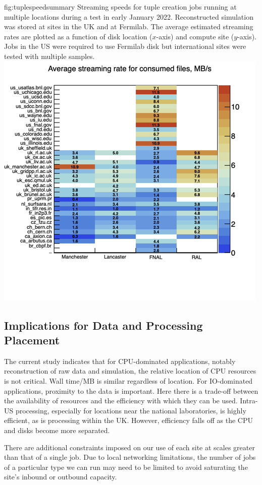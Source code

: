\documentclass[../main-v1.tex]{subfiles}
\begin{document}
\begin{dunefigure}
{fig:tuplespeedsummary} 
{Streaming speeds for tuple creation jobs running at multiple locations during a test in early January 2022. Reconstructed simulation was stored at sites in the UK and at Fermilab.  The average estimated streaming rates are plotted as a function of disk location ($x$-axis) and compute site ($y$-axis). Jobs in the US were required to use Fermilab disk but international sites were tested with multiple samples.}
\includegraphics[width=0.8 \textwidth]{graphics/Workflow/fastRates.png}
\end{dunefigure}

\subsection{Implications for Data and Processing Placement}

The current study indicates that for CPU-dominated applications, notably reconstruction of raw data and simulation, the relative location of CPU resources is not critical. Wall time/MB   is similar regardless of location. For IO-dominated applications, proximity to the data is important.  Here there is a trade-off between the availability of resources and the efficiency with which they can be used. Intra-US processing, especially for locations near the national laboratories, is highly efficient, as is processing within the UK.  However, efficiency falls off as the CPU and disks become more separated.  

There are additional constraints imposed on our use of each site at scales greater than that of a single job. Due to local networking limitations, the number of jobs of a particular type we can run may need to be limited to avoid saturating the site's inbound or outbound capacity. 
\end{document}
